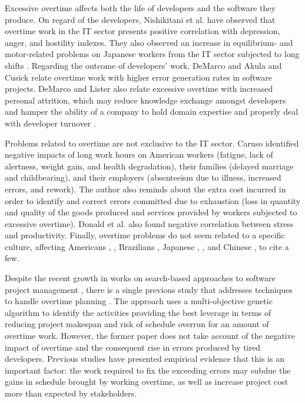 \documentclass[conference]{IEEEtran}
\begin{document}
Excessive overtime affects both the life of developers and the software they produce. On regard of the developers, Nishikitani et al. \cite{NISHIKITANI:2005} have observed that overtime work in the IT sector presents positive correlation with depression, anger, and hostility indexes. They also observed an increase in equilibrium- and motor-related problems on Japanese workers from the IT sector subjected to long shifts \cite{karita:2006}. Regarding the outcome of developers' work, DeMarco \cite{demarco:1982} and Akula and Cusick \cite{akula:2008} relate overtime work with higher error generation rates in software projects. DeMarco and Lister  \cite{demarco:1999} also relate excessive overtime with increased personal attrition, which may reduce knowledge exchange amongst developers  \cite{Andreas:2005} and hamper the ability of a company to hold domain expertise and properly deal with developer turnover \cite{amin:2011}.

Problems related to overtime are not exclusive to the IT sector. Caruso \cite{caruso:2006} identified negative impacts of long work hours on American workers (fatigue, lack of alertness, weight gain, and health degradation), their families (delayed marriage and childbearing), and their employers (absenteeism due to illness, increased errors, and rework). The author also reminds about the extra cost incurred in order to identify and correct errors committed due to exhaustion (loss in quantity and quality of the goods produced and services provided by workers subjected to excessive overtime). Donald et al. \cite{Donald:2005} also found negative correlation between stress and productivity. Finally, overtime problems do not seem related to a specific culture, affecting Americans \cite{caruso:2006}, \cite{Dembe:2005}, Brazilians \cite{fischer:2000}, Japanese \cite{karita:2006}, \cite{Sasaki:2007}, and Chinese \cite{Houdmont:2011}, to cite a few.

Despite the recent growth in works on search-based approaches to software project management \cite{ferrucci:2014}, there is a single previous study that addresses techniques to handle overtime planning \cite{Ferrucci:2013}. The approach uses a multi-objective genetic algorithm to identify the activities providing the best leverage in terms of reducing project makespan and risk of schedule overrun for an amount of overtime work. However, the former paper does not take account of the negative impact of overtime and the consequent rise in errors produced by tired developers. Previous studies \cite{demarco:1982} \cite{akula:2008} have presented empirical evidence that this is an important factor: the work required to fix the exceeding errors may subdue the gains in schedule brought by working overtime, as well as increase project cost more than expected by stakeholders.
\end{document}
